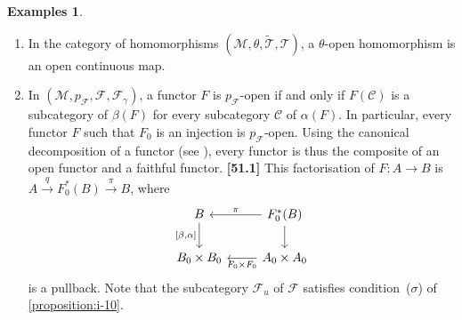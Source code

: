 \documentclass[a4paper,fleqn]{article}
\theoremstyle{plain}
\theoremstyle{definition}
\newtheorem*{examples}{Examples}
\newenvironment{longcomm}[1]
  {\noindent\textbf{[#1]}\rmfamily}
  {}
\newcommand{\CC}{\mathcal{C}}
\newcommand{\MM}{\mathcal{M}}
\newcommand{\FF}{\mathcal{F}}
\newcommand{\TT}{\mathcal{T}}
\newcommand{\tTT}{\widetilde{\TT}}
\begin{document}
\begin{examples}
  \begin{enumerate}
    \item
      In the category of homomorphisms $(\MM,\theta,\tTT,\TT)$, a $\theta$-open homomorphism is an open continuous map.

    \item
      In $(\MM,p_\FF,\FF,\FF_\gamma)$, a functor $F$ is $p_\FF$-open if and only if $F(\CC)$ is a subcategory of $\beta(F)$ for every subcategory $\CC$ of $\alpha(F)$.
      In particular, every functor $F$ such that $F_0$ is an injection is $p_\FF$-open.
      Using the canonical decomposition of a functor (see \cite{3a}), every functor is thus the composite of an open functor and a faithful functor.
      \begin{longcomm}{51.1}
        This factorisation of $F\colon A\to B$ is $A\xrightarrow{q}F_0^*(B)\xrightarrow{\pi}B$, where
        \[
          \begin{tikzcd}
            B \ar[d,swap,"{[\beta,\alpha]}"]
            & F_0^*(B) \ar[l,swap,"\pi"] \ar[d]
          \\B_0\times B_0
            & A_0\times A_0 \ar[l,"F_0\times F_0"]
          \end{tikzcd}
        \]
        is a pullback.
      \end{longcomm}
      Note that the subcategory $\FF_u$ of $\FF$ satisfies condition~($\sigma$) of \cref{proposition:i-10}.
  \end{enumerate}
\end{examples}
\end{document}
